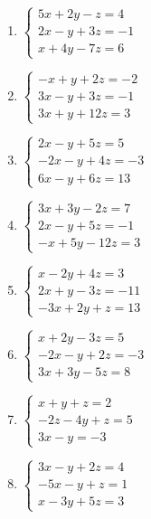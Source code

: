 \begin{enumerate}[topsep=0pt]
	\item $ \begin{cases}
		5x+2y-z=4 \\
		2x-y+3z = -1 \\
		x+4y-7z = 6
	\end{cases} $
	
	\item $ \begin{cases}
		-x + y +2z = -2 \\
		3x-y+3z = -1 \\
		3x+y+12z = 3
	\end{cases} $
	
	\item $ \begin{cases}
		2x - y + 5z = 5 \\
		-2x -y + 4z = -3 \\
		6x -y + 6z = 13
	\end{cases} $
	
	\item $ \begin{cases}
		3x+3y-2z = 7 \\
		2x-y+5z = -1 \\
		-x+5y-12z = 3
	\end{cases} $
	
	\item $ \begin{cases}
			x-2y + 4z = 3 \\
			2x+y-3z = -11 \\
			-3x+2y+z = 13
			\end{cases} $
	
	\item $ \begin{cases}
		x+2y-3z = 5 \\
		-2x-y+2z = -3 \\
		3x+3y-5z=8
	\end{cases} $

	
	\item $ \begin{cases}
		x+y+z= 2 \\
		-2z-4y+z = 5 \\
		3x-y = -3
	\end{cases} $
	
	\item $ \begin{cases}
		3x-y+2z=4\\
		-5x-y+z=1\\
		x-3y+5z=3
	\end{cases} $

\end{enumerate}


